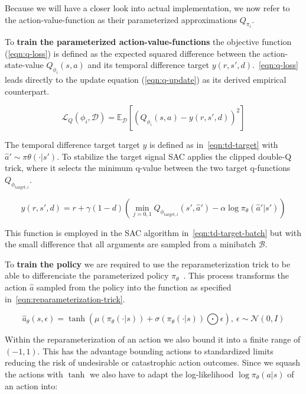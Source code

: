 Because we will have a closer look into actual implementation, we now refer to the action-value-function as their parameterized approximations $Q_{\pi_i}$.

To \textbf{train the parameterized action-value-functions} the objective function (\ref{eqn:q-loss}) is defined as the expected squared difference between the action-state-value $Q_{\phi_i}(s, a)$ and its temporal difference target $y(r, s', d)$.~\eqref{eqn:q-loss} leads directly to the update equation (\ref{eqn:q-update}) as its derived empirical counterpart.

\begin{equation}\label{eqn:q-loss}
	\mathcal{L}_Q(\phi_i, \mathcal{D}) = \mathbb{E}_\mathcal{D}\left[\left(Q_{\phi_i}(s, a) - y(r, s', d)\right)^2\right]
\end{equation}

The temporal difference target target $y$ is defined as in~\eqref{eqn:td-target} with $\hat{a}' \sim \pi\theta(\cdot| s')$. To stabilize the target signal SAC applies the clipped double-Q trick, where it selects the minimum q-value between the two target q-functions $Q_{\phi_{\text{target}, i}}$.

\begin{equation}\label{eqn:td-target}
	y(r, s', d) = r + \gamma(1 - d) \left(\min_{j=0,1}Q_{\phi_{\text{target}, i}}(s', \hat{a}') - \alpha \log \pi_\theta(\hat{a}'| s')\right)
\end{equation} 

This function is employed in the SAC algorithm in~\eqref{eqn:td-target-batch} but with the small difference that all arguments are sampled from a minibatch $\mathcal{B}$. 

To \textbf{train the policy} we are required to use the reparameterization trick to be able to differenciate the parameterized policy $\pi_\theta$~\cite{ReparameterizationTrick}.
This process transforms the action $\hat{a}$ sampled from the policy into the function as specified in~\eqref{eqn:reparameterization-trick}. 

\begin{equation}\label{eqn:reparameterization-trick}
	\hat{a}_\theta(s, \epsilon) = \tanh(\mu(\pi_\theta(\cdot|s)) + \sigma(\pi_\theta(\cdot|s)) \bigodot \epsilon), \ \epsilon \sim \mathcal{N}(0, I)
\end{equation}

Within the reparameterization of an action we also bound it into a finite range of $(-1, 1)$. This has the advantage bounding actions to standardized limits reducing the risk of undesirable or catastrophic action outcomes. Since we squash the actions with $\tanh$ we also have to adapt the log-likelihood $\log \pi_\theta(a|s)$ of an action into:

